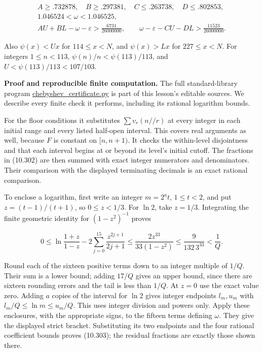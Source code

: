 \documentclass[
  11pt,
  a4paper,
]{article}
\begin{document}
\[
\begin{gathered}
A\ge.732878,\quad B\ge.297381,\quad
C\le.263738,\quad D\le.802853,\\
1.046524<\omega<1.046525,\\
AU+BL-\omega-\varepsilon>\frac{6731}{26000000},\qquad
\omega-\varepsilon-CU-DL>\frac{11523}{26000000}.
\end{gathered}
\tag{10.303}
\]

Also \(\psi(x)<Ux\) for \(114\le x<N\), and \(\psi(x)>Lx\) for
\(227\le x<N\). For integers \(1\le n<113\),
\(\psi(n)/n<\psi(113)/113\), and \(U<\psi(113)/113<107/103\).

\textbf{Proof and reproducible finite computation.} The full
standard-library program
\href{../figure_sources/chebyshev_certificate.py}{chebyshev\_certificate.py}
is part of this lesson's editable sources. We describe every finite
check it performs, including its rational logarithm bounds.

For the floor conditions it substitutes \(\sum v_r(n\mathbin{//}r)\) at
every integer in each initial range and every listed half-open interval.
This covers real arguments as well, because \(F\) is constant on
\([n,n+1)\). It checks the within-level disjointness and that each
interval begins at or beyond its level's initial cutoff. The fractions
in (10.302) are then summed with exact integer numerators and
denominators. Their comparison with the displayed terminating decimals
is an exact rational comparison.

To enclose a logarithm, first write an integer \(m=2^at\), \(1\le t<2\),
and put \(z=(t-1)/(t+1)\), so \(0\le z<1/3\). For \(\ln2\), take
\(z=1/3\). Integrating the finite geometric identity for
\((1-z^2)^{-1}\) proves

\[
0\le\ln\frac{1+z}{1-z}
 -2\sum_{j=0}^{15}\frac{z^{2j+1}}{2j+1}
\le\frac{2z^{33}}{33(1-z^2)}
\le\frac9{132\,3^{33}}<\frac1Q.
\tag{10.304}
\]

Round each of the sixteen positive terms down to an integer multiple of
\(1/Q\). Their sum is a lower bound; adding \(17/Q\) gives an upper
bound, since there are sixteen rounding errors and the tail is less than
\(1/Q\). At \(z=0\) use the exact value zero. Adding \(a\) copies of the
interval for \(\ln2\) gives integer endpoints \(l_m,u_m\) with
\(l_m/Q\le\ln m\le u_m/Q\). This uses integer division and powers only.
Apply these enclosures, with the appropriate signs, to the fifteen terms
defining \(\omega\). They give the displayed strict bracket.
Substituting its two endpoints and the four rational coefficient bounds
proves (10.303); the residual fractions are exactly those shown there.
\end{document}
